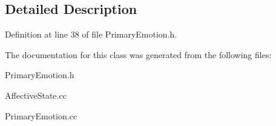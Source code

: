 \subsection{\-Detailed \-Description}


\-Definition at line 38 of file \-Primary\-Emotion.\-h.



\-The documentation for this class was generated from the following files\-:\begin{DoxyCompactItemize}
\item 
\-Primary\-Emotion.\-h\item 
\-Affective\-State.\-cc\item 
\-Primary\-Emotion.\-cc\end{DoxyCompactItemize}
